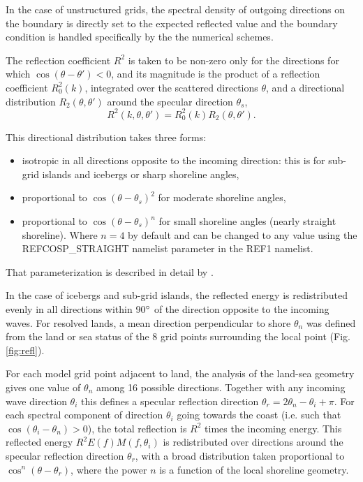 In the case of unstructured grids, the spectral density of outgoing directions
on the boundary is directly set to the expected reflected value and the
boundary condition is handled specifically by the the numerical schemes.


The reflection coefficient $R^2$ is taken to be non-zero only for the
directions for which $\cos(\theta-\theta')<0$, and its magnitude is the
product of a reflection coefficient $R_0^2(k)$, integrated over the scattered
directions $\theta$, and a directional distribution $R_2(\theta,\theta')$
around the specular direction $\theta_s$,
\begin{equation} 
R^2(k,\theta,\theta')  =  R_0^2(k) R_2(\theta,\theta').
\end{equation}

This directional distribution takes three forms: 
\begin{itemize}

\item isotropic in all directions opposite to the incoming direction: this is
      for sub-grid islands and icebergs or sharp shoreline angles, 

\item proportional to $\cos(\theta-\theta_s)^2$ for moderate shoreline angles,

\item proportional to $\cos(\theta-\theta_s)^n$ for small shoreline angles
      (nearly straight shoreline). Where $n=4$ by default and can be changed
      to any value using the REFCOSP\_STRAIGHT namelist parameter in the REF1
      namelist.

\end{itemize}

\noindent
That parameterization is described in detail by \cite{art:AR12}.

In the case of icebergs and sub-grid islands, the reflected energy is
redistributed evenly in all directions within 90$^\circ$ of the direction
opposite to the incoming waves.  For resolved lands, a mean direction
perpendicular to shore $\theta_n$ was defined from the land or sea status of
the 8 grid points surrounding the local point (Fig. \ref{fig:refl}).

For each model grid point adjacent to land, the analysis of the land-sea
geometry gives one value of $\theta_n$ among 16 possible directions. Together
with any incoming wave direction $\theta_i$ this defines a specular reflection
direction $\theta_r=2 \theta_n - \theta_i + \pi$.  For each spectral component
of direction $\theta_i$ going towards the coast (i.e. such that
$\cos(\theta_i-\theta_n) >0$), the total reflection is $R^2$ times the
incoming energy. This reflected energy $R^2 E(f) M(f,\theta_i)$ is
redistributed over directions around the specular reflection direction
$\theta_r$, with a broad distribution taken proportional to
$\cos^n(\theta-\theta_r)$, where the power $n$ is a function of the local
shoreline geometry.

